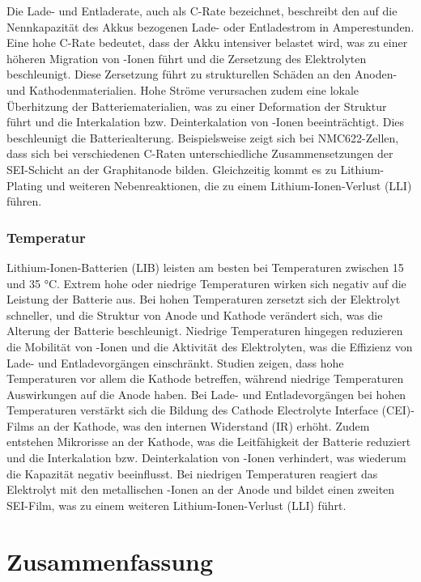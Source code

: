Die Lade- und Entladerate, auch als C-Rate bezeichnet, beschreibt den auf die Nennkapazität des Akkus bezogenen Lade- oder Entladestrom in Amperestunden. Eine hohe C-Rate bedeutet, dass der Akku intensiver belastet wird, was zu einer höheren Migration von -Ionen führt und die Zersetzung des Elektrolyten beschleunigt. Diese Zersetzung führt zu strukturellen Schäden an den Anoden- und Kathodenmaterialien. Hohe Ströme verursachen zudem eine lokale Überhitzung der Batteriematerialien, was zu einer Deformation der Struktur führt und die Interkalation bzw. Deinterkalation von -Ionen beeinträchtigt. Dies beschleunigt die Batteriealterung. Beispielsweise zeigt sich bei NMC622-Zellen, dass sich bei verschiedenen C-Raten unterschiedliche Zusammensetzungen der SEI-Schicht an der Graphitanode bilden. Gleichzeitig kommt es zu Lithium-Plating und weiteren Nebenreaktionen, die zu einem Lithium-Ionen-Verlust (LLI) führen.

\subsubsection{Temperatur}

Lithium-Ionen-Batterien (LIB) leisten am besten bei Temperaturen zwischen 15 und 35 °C. Extrem hohe oder niedrige Temperaturen wirken sich negativ auf die Leistung der Batterie aus. Bei hohen Temperaturen zersetzt sich der Elektrolyt schneller, und die Struktur von Anode und Kathode verändert sich, was die Alterung der Batterie beschleunigt. Niedrige Temperaturen hingegen reduzieren die Mobilität von -Ionen und die Aktivität des Elektrolyten, was die Effizienz von Lade- und Entladevorgängen einschränkt. Studien zeigen, dass hohe Temperaturen vor allem die Kathode betreffen, während niedrige Temperaturen Auswirkungen auf die Anode haben. Bei Lade- und Entladevorgängen bei hohen Temperaturen verstärkt sich die Bildung des Cathode Electrolyte Interface (CEI)-Films an der Kathode, was den internen Widerstand (IR) erhöht. Zudem entstehen Mikrorisse an der Kathode, was die Leitfähigkeit der Batterie reduziert und die Interkalation bzw. Deinterkalation von -Ionen verhindert, was wiederum die Kapazität negativ beeinflusst. Bei niedrigen Temperaturen reagiert das Elektrolyt mit den metallischen -Ionen an der Anode und bildet einen zweiten SEI-Film, was zu einem weiteren Lithium-Ionen-Verlust (LLI) führt.

\section{Zusammenfassung}


